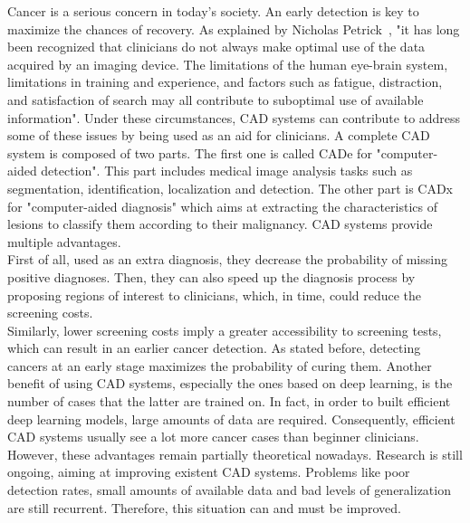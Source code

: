 \setlength{\marginparwidth}{3cm}\leavevmode {}Cancer is a serious concern in today's society. An early detection is key to maximize the chances of recovery. As explained by Nicholas Petrick~\cite{50}, "it has long been recognized that clinicians do not always make optimal use of the data acquired by an imaging device. The limitations of the human eye-brain system, limitations in training and experience, and factors such as fatigue, distraction, and satisfaction of search may all contribute to suboptimal use of available information". Under these circumstances, CAD systems can contribute to address some of these issues by being used as an aid for clinicians. A complete CAD system is composed of two parts. The first one is called CADe for "computer-aided detection". This part includes medical  image  analysis  tasks  such  as  segmentation,  identification,  localization  and  detection. The other part is CADx for "computer-aided diagnosis" which aims at extracting the characteristics of lesions to classify them according to their malignancy. CAD systems provide multiple advantages.\\
First of all, used as an extra diagnosis, they decrease the probability of missing positive diagnoses. Then, they can also speed up the diagnosis process by proposing regions of interest to clinicians, which, in time, could reduce the screening costs.\\
Similarly, lower screening costs imply a greater accessibility to screening tests, which can result in an earlier cancer detection. As stated before, detecting cancers at an early stage maximizes the probability of curing them. Another benefit of using CAD systems, especially the ones based on deep learning, is the number of cases that the latter are trained on. In fact, in order to built efficient deep learning models, large amounts of data are required. Consequently, efficient CAD systems usually see a lot more cancer cases than beginner clinicians.\\
However, these advantages remain partially theoretical nowadays. Research is still ongoing, aiming at improving existent CAD systems. Problems like poor detection rates, small amounts of available data and bad levels of generalization are still recurrent. Therefore, this situation can and must be improved.




